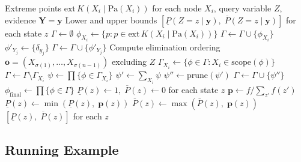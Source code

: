 \documentclass{article}
\begin{document}
\begin{algorithm}[H]
\caption{Credal Variable Elimination (CVE)}
\label{alg:cve}
\begin{algorithmic}[1]
\Require Extreme points $\mathrm{ext}\,K(X_i \mid \mathrm{Pa}(X_i))$ for each node $X_i$,
         query variable $Z$, evidence $\mathbf{Y} = \mathbf{y}$
\Ensure Lower and upper bounds $[\underline{P}(Z{=}z \mid \mathbf{y}),\;
        \overline{P}(Z{=}z \mid \mathbf{y})]$ for each state $z$
\Statex
\State $\Gamma \gets \emptyset$
  \State $\phi_{X_i} \gets \{p : p \in \mathrm{ext}\,K(X_i \mid \mathrm{Pa}(X_i))\}$
  \State $\Gamma \gets \Gamma \cup \{\phi_{X_i}\}$
\EndFor
{}
  \State $\phi'_{Y_j} \gets \{\delta_{y_j}\}$
  \State $\Gamma \gets \Gamma \cup \{\phi'_{Y_j}\}$
\EndFor
\Statex
\State Compute elimination ordering $\mathbf{o} = (X_{\sigma(1)}, \dots, X_{\sigma(n-1)})$
       excluding $Z$
  \State $\Gamma_{X_i} \gets \{\phi \in \Gamma : X_i \in \mathrm{scope}(\phi)\}$
  \State $\Gamma \gets \Gamma \setminus \Gamma_{X_i}$
  \State $\psi \gets \prod \{\phi \in \Gamma_{X_i}\}$
  \State $\psi' \gets \sum_{X_i} \psi$
  \State $\psi'' \gets \mathrm{prune}(\psi')$
  \State $\Gamma \gets \Gamma \cup \{\psi''\}$
\EndFor
\Statex
\State $\phi_{\mathrm{final}} \gets \prod \{\phi \in \Gamma\}$
\State $\underline{P}(z) \gets 1,\; \overline{P}(z) \gets 0$ for each state $z$
  \State $\mathbf{p} \gets f / \sum_{z'} f(z')$
    \State $\underline{P}(z) \gets \min(\underline{P}(z),\; \mathbf{p}(z))$
    \State $\overline{P}(z) \gets \max(\overline{P}(z),\; \mathbf{p}(z))$
  \EndFor
\EndFor
\State \Return $[\underline{P}(z),\; \overline{P}(z)]$ for each $z$
\end{algorithmic}
\end{algorithm}

\subsection{Running Example}
\end{document}
